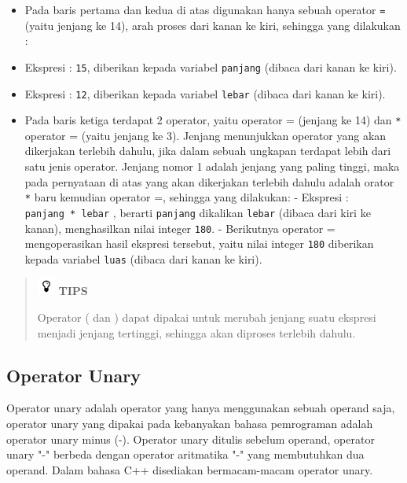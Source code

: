 \begin{itemize}

\item
  Pada baris pertama dan kedua di atas digunakan hanya sebuah operator
  \texttt{=} (yaitu jenjang ke 14), arah proses dari kanan ke kiri,
  sehingga yang dilakukan :
\item
  Ekspresi : \texttt{15}, diberikan kepada variabel \texttt{panjang}
  (dibaca dari kanan ke kiri).
\item
  Ekspresi : \texttt{12}, diberikan kepada variabel \texttt{lebar}
  (dibaca dari kanan ke kiri).
\item
  Pada baris ketiga terdapat 2 operator, yaitu operator =  (jenjang
  ke 14) dan \texttt{*} operator = (yaitu jenjang ke 3).
  Jenjang menunjukkan operator yang akan dikerjakan terlebih dahulu,
  jika dalam sebuah ungkapan terdapat lebih dari satu jenis operator.
  Jenjang nomor 1 adalah jenjang yang paling tinggi, maka pada
  pernyataan di atas yang akan dikerjakan terlebih dahulu adalah orator
  \texttt{*} baru kemudian operator =, sehingga yang dilakukan:
  - Ekspresi : \texttt{panjang\ *\ lebar} , berarti \texttt{panjang}
  dikalikan \texttt{lebar} (dibaca dari kiri ke kanan), menghasilkan
  nilai integer \texttt{180}. - Berikutnya operator = mengoperasikan
  hasil ekspresi tersebut, yaitu nilai integer \texttt{180} diberikan
  kepada variabel \texttt{luas} (dibaca dari kanan ke kiri).
\end{itemize}

\begin{quotation}
\includegraphics{images/tips}	\textbf{TIPS}
	
	Operator
	( dan ) dapat dipakai untuk merubah jenjang suatu ekspresi
	menjadi jenjang tertinggi, sehingga akan diproses terlebih dahulu.
\end{quotation}


\subsection{ Operator Unary}\label{a-operator-unary}

Operator unary adalah operator yang hanya menggunakan sebuah operand
saja, operator unary yang dipakai pada kebanyakan bahasa pemrograman
adalah operator unary minus (-). Operator unary ditulis sebelum operand,
operator unary "-" berbeda dengan operator aritmatika "-" yang
membutuhkan dua operand. Dalam bahasa C++ disediakan bermacam-macam
operator unary.

